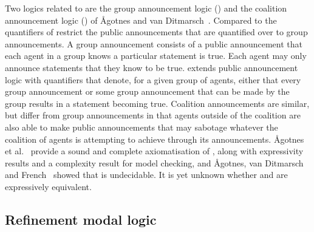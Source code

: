 Two logics related to \logicApal{} are the group announcement logic (\logicGal{}) and the coalition announcement logic (\logicCal{}) of {\AA}gotnes and van Ditmarsch~\cite{agotnes:2008,agotnes:2010}. 
Compared to \logicApal{} the quantifiers of \logicGal{} restrict the public announcements that are quantified over to group announcements.
A group announcement consists of a public announcement that each agent in a group knows a particular statement is true.
Each agent may only announce statements that they know to be true.
\logicGal{} extends public announcement logic with quantifiers that denote, for a given group of agents, either that every group announcement or some group announcement that can be made by the group results in a statement becoming true.
Coalition announcements are similar, but differ from group announcements in that agents outside of the coalition are also able to make public announcements that may sabotage whatever the coalition of agents is attempting to achieve through its announcements.
{\AA}gotnes et al.~\cite{agotnes:2010} provide a sound and complete axiomatisation of \logicGal{}, along with expressivity results and a complexity result for model checking, and {\AA}gotnes, van Ditmarsch and French~\cite{agotnes:2014} showed that \logicGal{} is undecidable.
It is yet unknown whether \logicGal{} and \logicCal{} are expressively equivalent.


\subsection{Refinement modal logic}

